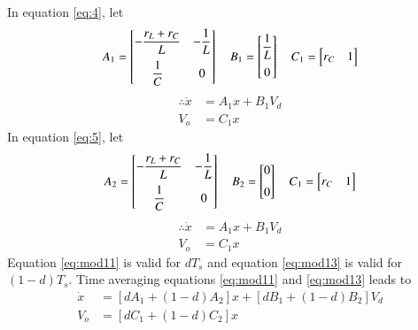 	In equation \eqref{eq:4}, let
	\begin{equation}
		A_1=
		\begin{bmatrix}
			-\dfrac{r_{L}+r_{C}}{L} & -\dfrac{1}{L}\vspace*{2mm}\\
			\dfrac{1}{C} & 0
		\end{bmatrix}
		\quad
		B_1=
		\begin{bmatrix}
			\dfrac{1}{L} \vspace*{2mm}\\ 0
		\end{bmatrix}
		\quad
		C_1 =
		\begin{bmatrix}
			r_{C} & 1
		\end{bmatrix}
		\label{eq:mod10}
	\end{equation}
	\begin{equation}
		\begin{split}
			\therefore \dot{x} &= A_1 x + B_1 V_d\\
			V_o &= C_1 x
		\end{split}
		\label{eq:mod11}
	\end{equation}
	In equation \eqref{eq:5}, let
	\begin{equation}
		A_2=
		\begin{bmatrix}
			-\dfrac{r_{L}+r_{C}}{L} & -\dfrac{1}{L}\vspace*{2mm}\\
			\dfrac{1}{C} & 0
		\end{bmatrix}
		\quad
		B_2=
		\begin{bmatrix}
			0 \vspace*{2mm}\\ 0
		\end{bmatrix}
		\quad
		C_1 =
		\begin{bmatrix}
			r_{C} & 1
		\end{bmatrix}
		\label{eq:mod12}
	\end{equation}
	\begin{equation}
		\begin{split}
			\therefore \dot{x} &= A_1 x + B_1 V_d\\
			V_o &= C_1 x
		\end{split}
		\label{eq:mod13}
	\end{equation}
	Equation \eqref{eq:mod11} is valid for $dT_s$ and equation \eqref{eq:mod13} is valid for $(1-d)T_s$. Time averaging equations \eqref{eq:mod11} and \eqref{eq:mod13} leads to
	\begin{equation}
	    \begin{split}
    		\dot{x} &= [dA_1+(1-d)A_2]x + [dB_1 + (1-d)B_2]V_d\\
	    	V_o &= [dC_1+(1-d)C_2]x
		    \label{eq:mod14}
	    \end{split}
	\end{equation}

